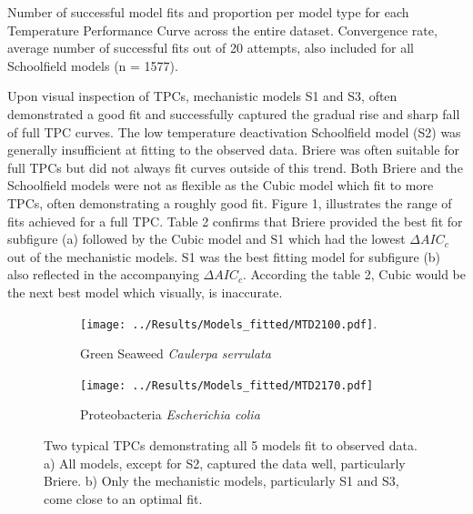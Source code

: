 \documentclass[11pt]{article}
\begin{document}
\begin{linenumbers}
\begin{table}[H]
\FloatBarrier
\centering
\caption{Number of successful model fits and proportion per model type for each Temperature Performance Curve across the entire dataset. Convergence rate, average number of successful fits out of 20 attempts, also included for all Schoolfield models (n = 1577).}
\begin{adjustbox}{height = 1.7cm, width=11cm}
\centering
 
\FloatBarrier
\end{adjustbox}
\end{table} 

Upon visual inspection of TPCs, mechanistic models S1 and S3, often demonstrated a good fit and successfully captured the gradual rise and sharp fall of full TPC curves. The low temperature deactivation Schoolfield model (S2) was generally insufficient at fitting to the observed data. Briere was often suitable for full TPCs but did not always fit curves outside of this trend. Both Briere and the Schoolfield models were not as flexible as the Cubic model which fit to more TPCs, often demonstrating a roughly good fit. Figure 1, illustrates the range of fits achieved for a full TPC. Table 2 confirms that Briere provided the best fit for subfigure (a) followed by the Cubic model and S1 which had the lowest \(\Delta AIC_c\) out of the mechanistic models. S1 was the best fitting model for subfigure (b) also reflected in the accompanying \(\Delta AIC_c\). According the table 2, Cubic would be the next best model which visually, is inaccurate.

\begin{figure}[H]
	\centering
	\begin{subfigure}{0.5\textwidth}
		\centering
		\texttt{[image: ../Results/Models\_fitted/MTD2100.pdf]}.
		\caption{Green Seaweed \textit{Caulerpa serrulata} }
		\label{fig:sub1}
	\end{subfigure}%
	\begin{subfigure}{0.5\textwidth}
		\centering
		\texttt{[image: ../Results/Models\_fitted/MTD2170.pdf]}
		\caption{ Proteobacteria \textit{Escherichia colia}}
		\label{fig:sub2}
	\end{subfigure}
	\caption{Two typical TPCs demonstrating all 5 models fit to observed data. a) All models, except for S2, captured the data well, particularly Briere. b) Only the mechanistic models, particularly S1	and S3, come close to an optimal fit.}
	\label{fig:test}
\end{figure}




\end{linenumbers}
\end{document}
